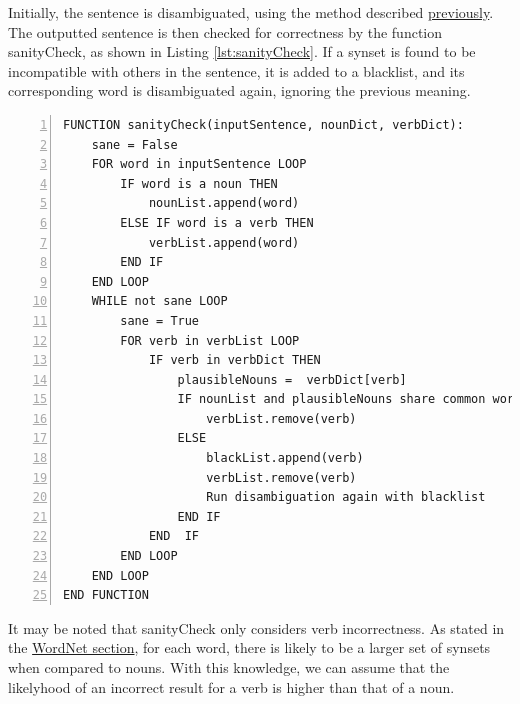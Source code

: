 \documentclass[]{article}
\begin{document}
Initially, the sentence is disambiguated, using the method described \hyperref[sec:ImplementedDisambiguation]{previously}. The outputted sentence is then checked for correctness by the function sanityCheck, as shown in Listing \ref{lst:sanityCheck}. If a synset is found to be incompatible with others in the sentence, it is added to a blacklist, and its corresponding word is disambiguated again, ignoring the previous meaning.

\begin{lstlisting}[numbers=left, numberstyle=\small, caption={The sanityCheck function}, captionpos=b, label={lst:sanityCheck}]
FUNCTION sanityCheck(inputSentence, nounDict, verbDict):
    sane = False
    FOR word in inputSentence LOOP
        IF word is a noun THEN
            nounList.append(word)
        ELSE IF word is a verb THEN
            verbList.append(word)
        END IF
    END LOOP
    WHILE not sane LOOP
        sane = True
        FOR verb in verbList LOOP
            IF verb in verbDict THEN
                plausibleNouns =  verbDict[verb]
                IF nounList and plausibleNouns share common words THEN
                    verbList.remove(verb)
                ELSE
                    blackList.append(verb)
                    verbList.remove(verb)
                    Run disambiguation again with blacklist
                END IF
            END  IF
		END LOOP
	END LOOP
END FUNCTION
\end{lstlisting}

It may be noted that sanityCheck only considers verb incorrectness. As stated in the \hyperref[Verbs]{WordNet section}, for each word, there is likely to be a larger set of synsets when compared to nouns. With this knowledge, we can assume that the likelyhood of an incorrect result for a verb is higher than that of a noun. 


\newpage


\end{document}
